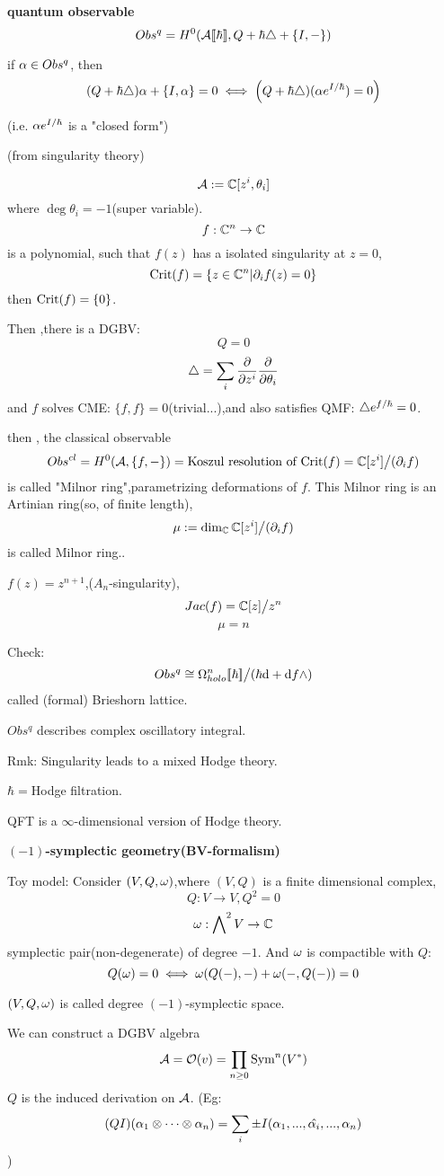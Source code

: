 \textbf{quantum observable}
$$Obs^q=H^0(\mathcal{A}[\![\hbar]\!],Q+\hbar\triangle+\{I,-\})$$

if $\alpha\in Obs^q$, then
$$(Q+\hbar\triangle)\alpha+\{I,\alpha\}=0
\iff\left
(Q+\hbar\triangle)(\alpha e^{I/\hbar})=0
\right)$$

(i.e. $\alpha e^{I/\hbar}$ is a "closed form")

\begin{example}(from singularity theory)

$$\mathcal{A}:=\mathbb{C}[z^i,\theta_i]$$
where $\deg\theta_i=-1$(super variable).
$$f:\mathbb{C}^n\to\mathbb{C}$$
is a polynomial, such that $f(z)$ has a isolated singularity  at $z=0$,
$$\operatorname{Crit}(f)=\{z\in\mathbb{C}^n|\partial_if(z)=0\}$$
then $\operatorname{Crit}(f)=\{0\}$.

Then ,there is a DGBV:
$$Q=0$$
$$\triangle=\sum_i\frac{\partial } {\partial z^i}\frac{\partial } {\partial \theta_i}$$
and $f$ solves CME: $\{f,f\}=0$(trivial...),and also satisfies QMF:
$\triangle e^{f/\hbar}=0$.
\end{example}

then , the classical observable
$$Obs^{cl}=H^0(\mathcal{A},\{f,-\})=
\text{Koszul resolution of $\operatorname{Crit}(f)$}
=\mathbb{C}[z^i]\big/(\partial_if)$$
is called "Milnor ring",parametrizing deformations of $f$.
This Milnor ring is an Artinian ring(so, of finite length),
$$\mu:=\dim_{\mathbb{C}}\mathbb{C}[z^i]\big/(\partial_if)$$
is called Milnor ring..

\begin{example}
$f(z)=z^{n+1}$,($A_n$-singularity),
$$Jac(f)=\mathbb{C}[z]\big/z^n$$
$$\mu=n$$
\end{example}

Check:
$$Obs^q\cong\Omega_{holo}^n[\![\hbar]\!]\big/
(\hbar\mathrm{d}+\mathrm{d} f\wedge)$$
called (formal) Brieshorn lattice.

$Obs^q$ describes complex oscillatory integral.

Rmk: Singularity leads to a mixed Hodge theory.

$\hbar=$Hodge filtration.

QFT is a $\infty$-dimensional version of Hodge theory.

\textbf{$(-1)$-symplectic geometry(BV-formalism)}

Toy model:
Consider $(V,Q,\omega)$,where $(V,Q)$ is a finite dimensional complex,
$$Q:V\to V,Q^2=0$$
$$\omega:\bigwedge\nolimits^{2}V\to\mathbb{C}$$
symplectic pair(non-degenerate) of degree $-1$.
And $\omega$ is compactible with $Q$:
$$Q(\omega)=0\iff
\omega(Q(-),-)+\omega(-,Q(-))=0$$

$(V,Q,\omega)$ is called degree $(-1)$-symplectic space.

We can construct a DGBV algebra
$$\mathcal{A}=\mathcal{O}(v)=\prod_{n\geq 0}\operatorname{Sym}^n(V^*)$$
$Q$ is the induced derivation on $\mathcal{A}$.
(Eg:
$$(QI)(\alpha_1\otimes\cdots\otimes\alpha_n)=
\sum_i\pm I(\alpha_1,...,\hat{\alpha_i},...,\alpha_n)$$
)

